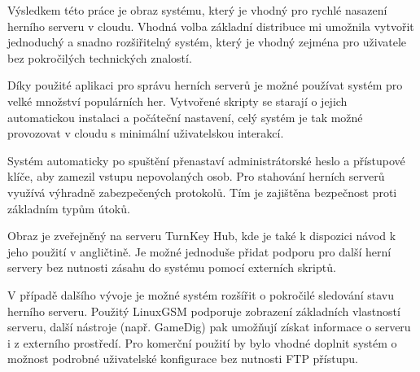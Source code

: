 \begin{conclusion}
    Výsledkem této práce je obraz systému, který je vhodný pro rychlé nasazení herního serveru v cloudu.
    Vhodná volba základní distribuce mi umožnila vytvořit jednoduchý a snadno rozšiřitelný systém,
    který je vhodný zejména pro uživatele bez pokročilých technických znalostí.

    Díky použité aplikaci pro správu herních serverů je možné používat systém pro velké množství populárních her.
    Vytvořené skripty se starají o jejich automatickou instalaci a počáteční nastavení, celý systém je tak
    možné provozovat v cloudu s minimální uživatelskou interakcí.

    Systém automaticky po spuštění přenastaví administrátorské heslo a přístupové klíče, aby zamezil vstupu
    nepovolaných osob. Pro stahování herních serverů využívá výhradně zabezpečených protokolů.
    Tím je zajištěna bezpečnost proti základním typům útoků.

    Obraz je zveřejněný na serveru TurnKey Hub, kde je také k dispozici návod k jeho použití v angličtině.
    Je možné jednoduše přidat podporu pro další herní servery bez nutnosti zásahu do systému pomocí externích skriptů.

    V případě dalšího vývoje je možné systém rozšířit o pokročilé sledování stavu herního serveru. Použitý LinuxGSM podporuje
    zobrazení základních vlastností serveru, další nástroje (např. GameDig) pak umožňují získat informace o serveru i z externího
    prostředí. Pro komerční použití by bylo vhodné doplnit systém o možnost podrobné uživatelské konfigurace bez nutnosti FTP přístupu.
\end{conclusion}